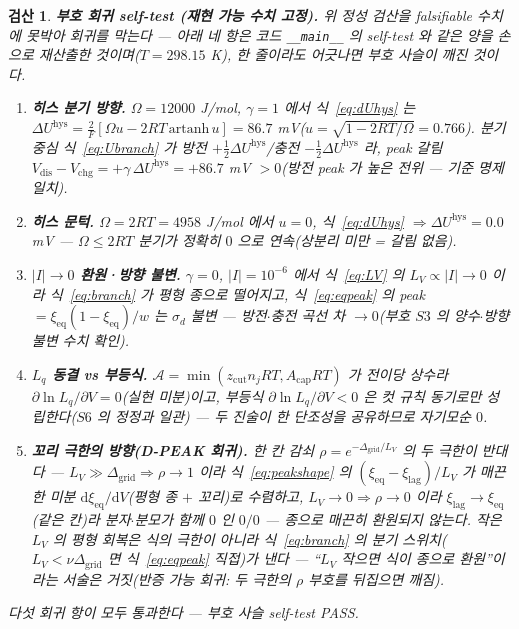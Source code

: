 \documentclass[11pt,a4paper]{article}
\newtheorem*{verifybox}{검산}
\newcommand{\dd}{\mathrm{d}}
\newcommand{\eq}{\mathrm{eq}}
\newcommand{\dis}{\mathrm{dis}}
\newcommand{\chg}{\mathrm{chg}}
\newcommand{\hys}{\mathrm{hys}}
\newcommand{\code}[1]{\texttt{#1}}
\begin{document}
\begin{verifybox}
\textbf{부호 회귀 self-test (재현 가능 수치 고정).} 위 정성 검산을 falsifiable 수치에 못박아 회귀를 막는다 — 아래
네 항은 코드 \code{\_\_main\_\_} 의 self-test 와 같은 양을 손으로 재산출한 것이며($T=298.15$ K), 한 줄이라도 어긋나면
부호 사슬이 깨진 것이다.
\begin{enumerate}[label=\textbf{R\arabic*.},leftmargin=2.6em,itemsep=1pt]
\item \textbf{히스 분기 방향.} $\Omega=12000$ J/mol, $\gamma=1$ 에서 식~\eqref{eq:dUhys} 는
$\Delta U^\hys=\frac{2}{F}[\Omega u-2RT\,\mathrm{artanh}\,u]=86.7$ mV($u=\sqrt{1-2RT/\Omega}=0.766$). 분기 중심
식~\eqref{eq:Ubranch} 가 방전 $+\tfrac12\Delta U^\hys$/충전 $-\tfrac12\Delta U^\hys$ 라, peak 갈림
$V_\dis-V_\chg=+\gamma\,\Delta U^\hys=+86.7$ mV $>0$(방전 peak 가 높은 전위 — 기준 명제 일치).
\item \textbf{히스 문턱.} $\Omega=2RT=4958$ J/mol 에서 $u=0$, 식~\eqref{eq:dUhys} $\Rightarrow\Delta U^\hys=0.0$ mV —
$\Omega\le2RT$ 분기가 정확히 $0$ 으로 연속(상분리 미만 = 갈림 없음).
\item \textbf{$|I|\!\to\!0$ 환원·방향 불변.} $\gamma=0$, $|I|=10^{-6}$ 에서 식~\eqref{eq:LV} 의 $L_V\propto|I|\to0$ 이라
식~\eqref{eq:branch} 가 평형 종으로 떨어지고, 식~\eqref{eq:eqpeak} 의 peak $=\xi_\eq(1-\xi_\eq)/w$ 는 $\sigma_d$ 불변 —
방전$\cdot$충전 곡선 차 $\to0$(부호 $S3$ 의 양수$\cdot$방향 불변 수치 확인).
\item \textbf{$L_q$ 동결 vs 부등식.} $\mathcal A=\min(z_\mathrm{cut}n_jRT,A_\mathrm{cap}RT)$ 가 전이당 상수라
$\partial\ln L_q/\partial V=0$(실현 미분)이고, 부등식 $\partial\ln L_q/\partial V<0$ 은 컷 규칙 동기로만 성립한다($S6$ 의
정정과 일관) — 두 진술이 한 단조성을 공유하므로 자기모순 $0$.
\item \textbf{꼬리 극한의 방향(D-PEAK 회귀).} 한 칸 감쇠 $\rho=e^{-\Delta_\mathrm{grid}/L_V}$ 의 두 극한이 반대다 —
$L_V\!\gg\!\Delta_\mathrm{grid}\Rightarrow\rho\to1$ 이라 식~\eqref{eq:peakshape} 의 $(\xi_\eq-\xi_\mathrm{lag})/L_V$ 가
매끈한 미분 $\dd\xi_\eq/\dd V$(평형 종 $+$ 꼬리)로 수렴하고, $L_V\!\to\!0\Rightarrow\rho\to0$ 이라 $\xi_\mathrm{lag}\to\xi_\eq$
(같은 칸)라 분자$\cdot$분모가 함께 $0$ 인 $0/0$ — \emph{종으로 매끈히 환원되지 않는다}. 작은 $L_V$ 의 평형 회복은 식의
극한이 아니라 식~\eqref{eq:branch} 의 분기 스위치($L_V<\nu\Delta_\mathrm{grid}$ 면 식~\eqref{eq:eqpeak} 직접)가 낸다 —
``$L_V$ 작으면 식이 종으로 환원''이라는 서술은 거짓(반증 가능 회귀: 두 극한의 $\rho$ 부호를 뒤집으면 깨짐).
\end{enumerate}
다섯 회귀 항이 모두 통과한다 — 부호 사슬 self-test PASS.
\end{verifybox}
\end{document}
